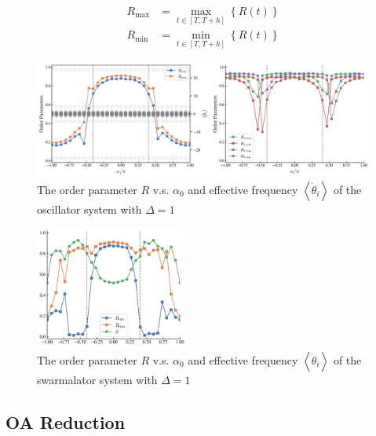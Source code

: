 \documentclass{article}
\begin{document}
\begin{subequations}
    \begin{align}
        R_{\max}&=\max_{t\in \left[ T,T+h \right]} \left\{ R\left( t \right) \right\} 
        \\
        R_{\min}&=\min_{t\in \left[ T,T+h \right]} \left\{ R\left( t \right) \right\} 
    \end{align}
\end{subequations}

\begin{figure}[H]
    \centering
    \includegraphics[width=1\textwidth]{figs/PurePhase_OrderParameter_R_l9.6_dO1.png}
    \caption{The order parameter $R$ v.s. $\alpha_0$ and effective frequency $\left<\dot{\theta}_i\right>$ of the oscillator system with $\Delta =1$}
\end{figure}

\begin{figure}[H]
    \centering
    \includegraphics[width=0.45\textwidth]{figs/MeanFieldChiralInducedPhaseLag_OrderParameter_R_l9.6_d1_dO1_rS10.png}
    \caption{The order parameter $R$ v.s. $\alpha_0$ and effective frequency $\left<\dot{\theta}_i\right>$ of the swarmalator system with $\Delta =1$}
\end{figure}

\subsection{OA Reduction}
\end{document}
